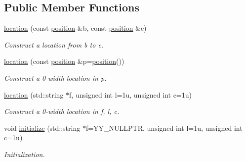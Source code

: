 \subsection*{Public Member Functions}
\begin{DoxyCompactItemize}
\item 
\hyperlink{classyy_1_1location_a0d659c37bcd57075c7bb25e600d3f526}{location} (const \hyperlink{classyy_1_1position}{position} \&b, const \hyperlink{classyy_1_1position}{position} \&e)\hypertarget{classyy_1_1location_a0d659c37bcd57075c7bb25e600d3f526}{}\label{classyy_1_1location_a0d659c37bcd57075c7bb25e600d3f526}

\begin{DoxyCompactList}\small\item\em Construct a location from {\itshape b} to {\itshape e}. \end{DoxyCompactList}\item 
\hyperlink{classyy_1_1location_a378c53e8dc67416748f0b12844919e51}{location} (const \hyperlink{classyy_1_1position}{position} \&p=\hyperlink{classyy_1_1position}{position}())\hypertarget{classyy_1_1location_a378c53e8dc67416748f0b12844919e51}{}\label{classyy_1_1location_a378c53e8dc67416748f0b12844919e51}

\begin{DoxyCompactList}\small\item\em Construct a 0-\/width location in {\itshape p}. \end{DoxyCompactList}\item 
\hyperlink{classyy_1_1location_a75594362f84338b764164cd632ee7d9e}{location} (std\+::string $\ast$f, unsigned int l=1u, unsigned int c=1u)\hypertarget{classyy_1_1location_a75594362f84338b764164cd632ee7d9e}{}\label{classyy_1_1location_a75594362f84338b764164cd632ee7d9e}

\begin{DoxyCompactList}\small\item\em Construct a 0-\/width location in {\itshape f}, {\itshape l}, {\itshape c}. \end{DoxyCompactList}\item 
void \hyperlink{classyy_1_1location_ac21a2ea2c80bb267f0f44a6517e8ac17}{initialize} (std\+::string $\ast$f=Y\+Y\+\_\+\+N\+U\+L\+L\+P\+TR, unsigned int l=1u, unsigned int c=1u)\hypertarget{classyy_1_1location_ac21a2ea2c80bb267f0f44a6517e8ac17}{}\label{classyy_1_1location_ac21a2ea2c80bb267f0f44a6517e8ac17}

\begin{DoxyCompactList}\small\item\em Initialization. \end{DoxyCompactList}\end{DoxyCompactItemize}
